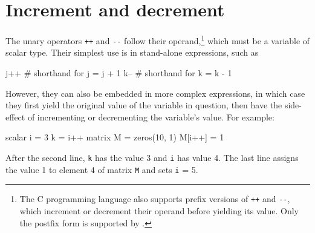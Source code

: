 \section{Increment and decrement}

The unary operators \texttt{++} and \verb|--| follow their
operand,\footnote{The C programming language also supports prefix
  versions of \texttt{++} and \verb|--|, which increment or decrement
  their operand before yielding its value. Only the postfix form is
  supported by .}  which must be a variable of scalar
type. Their simplest use is in stand-alone expressions, such as
%
\begin{code}
j++  # shorthand for j = j + 1
k--  # shorthand for k = k - 1
\end{code}
%
However, they can also be embedded in more complex expressions, in
which case they first yield the original value of the variable in
question, then have the side-effect of incrementing or decrementing
the variable's value. For example:
%
\begin{code}
scalar i = 3
k = i++
matrix M = zeros(10, 1)
M[i++] = 1
\end{code}
%
After the second line, \texttt{k} has the value 3 and \texttt{i} has
value 4. The last line assigns the value 1 to element 4 of
matrix \texttt{M} and sets \texttt{i} = 5.










